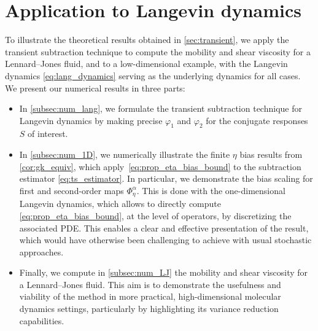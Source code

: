 \section{Application to Langevin dynamics}
\label{sec:numerical}
%
%
%
To illustrate the theoretical results obtained in \cref{sec:transient}, we apply the transient subtraction technique to compute the mobility and shear viscosity for a Lennard--Jones fluid, and to a low-dimensional example, with the Langevin dynamics \eqref{eq:lang_dynamics} serving as the underlying dynamics for all cases. We present our numerical results in three parts:
%
\begin{itemize}
	\item In \cref{subsec:num_lang}, we formulate the transient subtraction technique for Langevin dynamics by making precise $\varphi_1$ and $\varphi_2$ for the conjugate responses $S$ of interest.
	 \item In \cref{subsec:num_1D}, we numerically illustrate the finite $\eta$ bias results from \cref{cor:gk_equiv}, which apply~\eqref{eq:prop_eta_bias_bound} to the subtraction estimator \eqref{eq:ts_estimator}. In particular, we demonstrate the bias scaling for first and second-order maps $\Phi_\eta^\alpha$. This is done with the one-dimensional Langevin dynamics, which allows to directly compute \eqref{eq:prop_eta_bias_bound}, at the level of operators, by discretizing the associated PDE. This enables a clear and effective presentation of the result, which would have otherwise been challenging to achieve with usual stochastic approaches. %
	 \item Finally, we compute in \cref{subsec:num_LJ} the mobility and shear viscosity for a Lennard--Jones fluid. This aim is to demonstrate the usefulness and viability of the method in more practical, high-dimensional molecular dynamics settings, particularly by highlighting its variance reduction capabilities.
%
\end{itemize}

